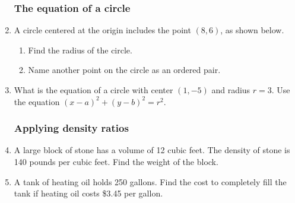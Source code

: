 \documentclass[12pt, twoside]{article}
\begin{document}
\begin{enumerate}
\newpage
\subsubsection*{The equation of a circle}

\item A circle centered at the origin includes the point $(8,6)$, as shown below.
  \begin{multicols}{2}
    \raggedcolumns
    \begin{enumerate}
      \item Find the radius of the circle. \vspace{2.7cm}
      \item Name another point on the circle as an ordered pair.
    \end{enumerate}
  \end{multicols}

\item What is the equation of a circle with center $(1,-5)$ and radius $r=3$. Use the equation $(x-a)^2+(y-b)^2=r^2$. \vspace{1.5cm}
  
\subsubsection*{Applying density ratios}
\item A large block of stone has a volume of 12 cubic feet. The density of stone is 140 pounds per cubic feet. Find the weight of the block.  \vspace{3cm}
\item A tank of heating oil holds 250 gallons. Find the cost to completely fill the tank if heating oil costs \$3.45 per gallon. \vspace{3cm}


\end{enumerate}
\end{document}
